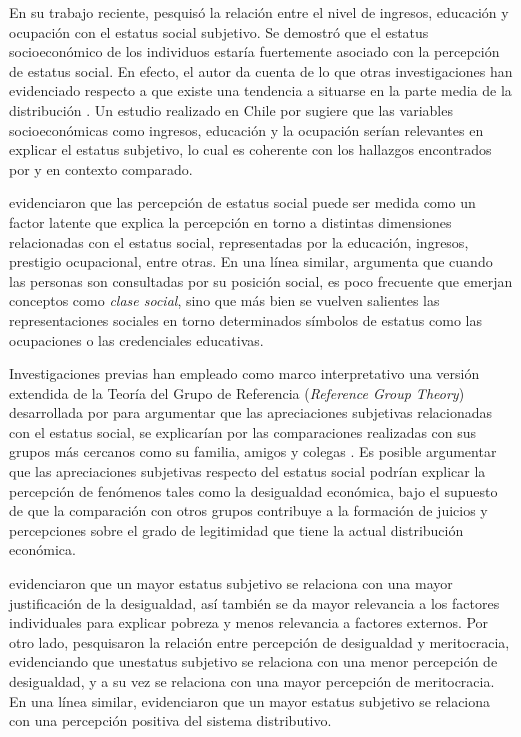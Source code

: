 \documentclass[12pt]{article}
\begin{document}
En su trabajo reciente, \cite{Andersson2018a} pesquisó la relación entre el nivel de ingresos, educación y ocupación con el estatus social subjetivo. Se demostró que el estatus socioeconómico de los individuos estaría fuertemente asociado con la percepción de estatus social. En efecto, el autor da cuenta de lo que otras investigaciones han evidenciado respecto a que existe una tendencia a situarse en la parte media de la distribución \citep{Evans2004,Castillo2013,Lindemann2014}. Un estudio realizado en Chile por \cite{Castillo2013} sugiere que las variables socioeconómicas como ingresos, educación y la ocupación serían relevantes en explicar el estatus subjetivo, lo cual es coherente con los hallazgos encontrados por \cite{Evans2004} y \cite{Lindemann2014} en contexto comparado. 

\citet{slomczynski1987} evidenciaron que las percepción de estatus social puede ser medida como un factor latente que explica la percepción en torno a distintas dimensiones relacionadas con el estatus social, representadas por la educación, ingresos, prestigio ocupacional, entre otras. En una línea similar, \cite{Manstead2018} argumenta que cuando las personas son consultadas por su posición social, es poco frecuente que emerjan conceptos como \emph{clase social}, sino que más bien  se vuelven salientes las representaciones sociales en torno determinados símbolos de estatus como las ocupaciones o las credenciales educativas. 

Investigaciones previas han empleado como marco interpretativo una versión extendida de la Teoría del Grupo de Referencia (\emph{Reference Group Theory}) desarrollada por \cite{Merton1968} para argumentar que las apreciaciones subjetivas relacionadas con el estatus social, se explicarían por las comparaciones realizadas con sus grupos más cercanos como su familia, amigos y colegas \citep{Evans1992,Lindemann2014}. Es posible argumentar que las apreciaciones subjetivas respecto del estatus social podrían explicar la percepción de fenómenos tales como la desigualdad económica, bajo el supuesto de que la comparación con otros grupos contribuye a la formación de juicios y percepciones sobre el grado de legitimidad que tiene la actual distribución económica. 

\cite{Schneider2015} evidenciaron que un mayor estatus subjetivo se relaciona con una mayor justificación de la desigualdad, así también se da mayor relevancia a los factores individuales para explicar pobreza y menos relevancia a factores externos. Por otro lado, \citet{Castillo2018} pesquisaron la relación entre percepción de desigualdad y meritocracia, evidenciando que unestatus subjetivo se relaciona con una menor percepción de desigualdad, y a su vez se relaciona con una mayor percepción de meritocracia. En una línea similar, \cite{Vargas-Salfate2018} evidenciaron que un mayor estatus subjetivo se relaciona con una percepción positiva del sistema distributivo. 
\end{document}
